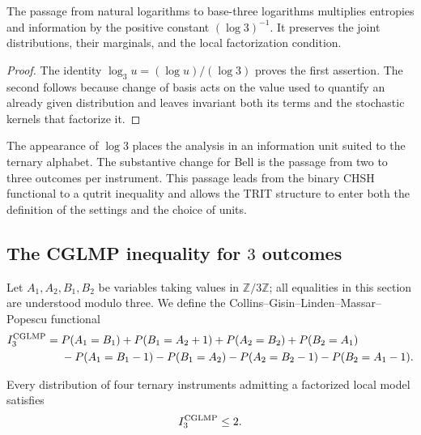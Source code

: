 \begin{proposition}
\label{prop:log3-localidad}
The passage from natural logarithms to base-three logarithms multiplies entropies and
information by the positive constant \((\log 3)^{-1}\). It preserves the
joint distributions, their marginals, and the local factorization condition.
\end{proposition}

\begin{proof}
The identity \(\log_3u=(\log u)/(\log 3)\) proves the first assertion. The second follows
because change of basis acts on the value used to quantify an already given
distribution and leaves invariant both its terms and the stochastic kernels
that factorize it.
\end{proof}

The appearance of \(\log 3\) places the analysis in an information unit suited to the
ternary alphabet. The substantive change for Bell is the passage from two to three outcomes
per instrument. This passage leads from the binary CHSH functional to a
qutrit inequality and allows the TRIT structure to enter both the definition of the
settings and the choice of units.

\subsection{The CGLMP inequality for \(3\) outcomes}

Let \(A_1,A_2,B_1,B_2\) be variables taking values in
\(\mathbb Z/3\mathbb Z\); all equalities in this section are understood
modulo three. We define the
Collins--Gisin--Linden--Massar--Popescu functional \cite{CGLMP2002}
\begin{align}
 I_3^{\rm CGLMP}={}&P(A_1=B_1)+P(B_1=A_2+1)
 +P(A_2=B_2)+P(B_2=A_1)\notag\\
 &-P(A_1=B_1-1)-P(B_1=A_2)
 -P(A_2=B_2-1)-P(B_2=A_1-1).
 \label{eq:cglmp-tres}
\end{align}

\begin{theorem}
\label{thm:cglmp-local}
Every distribution of four ternary instruments admitting a factorized local
model satisfies
\[
 I_3^{\rm CGLMP}\leq2.
\]
\end{theorem}

